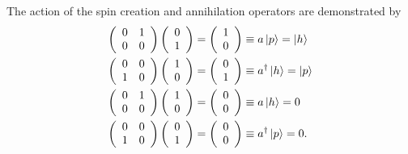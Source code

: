 \documentclass[aps,preprint]{revtex4}%
\begin{document}
The action of the spin creation and annihilation operators are demonstrated
by
\begin{align}
\left(
\begin{array}
[c]{cc}%
0 & 1\\
0 & 0
\end{array}
\right)  \left(
\begin{array}
[c]{c}%
0\\
1
\end{array}
\right)   &  =\left(
\begin{array}
[c]{c}%
1\\
0
\end{array}
\right)  \equiv a\left\vert p\right\rangle =\left\vert h\right\rangle \\
\left(
\begin{array}
[c]{cc}%
0 & 0\\
1 & 0
\end{array}
\right)  \left(
\begin{array}
[c]{c}%
1\\
0
\end{array}
\right)   &  =\left(
\begin{array}
[c]{c}%
0\\
1
\end{array}
\right)  \equiv a^{\dagger}\left\vert h\right\rangle =\left\vert
p\right\rangle \\
\left(
\begin{array}
[c]{cc}%
0 & 1\\
0 & 0
\end{array}
\right)  \left(
\begin{array}
[c]{c}%
1\\
0
\end{array}
\right)   &  =\left(
\begin{array}
[c]{c}%
0\\
0
\end{array}
\right)  \equiv a\left\vert h\right\rangle =0\\
\left(
\begin{array}
[c]{cc}%
0 & 0\\
1 & 0
\end{array}
\right)  \left(
\begin{array}
[c]{c}%
0\\
1
\end{array}
\right)   &  =\left(
\begin{array}
[c]{c}%
0\\
0
\end{array}
\right)  \equiv a^{\dagger}\left\vert p\right\rangle =0.
\end{align}
\end{document}
